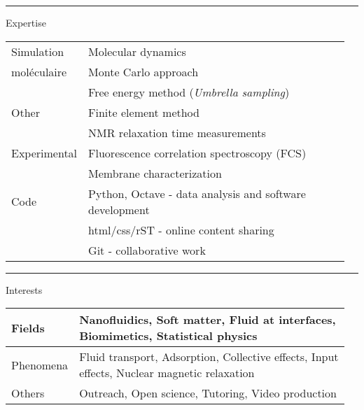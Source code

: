 \documentclass[a4paper,11pt]{concours}
\begin{document}
\newpage

\vspace{0.5cm}

\noindent\begin{minipage}{0.135\linewidth}
{\color{gray120}\rule{\textwidth}{0.22cm}\relax}
\end{minipage}
\begin{minipage}{0.82\linewidth}
{\textcolor{gray120}{\huge Expertise}}
\end{minipage}

\begin{table}[htbp]
\begin{tabular}{@{} p{0.12\linewidth} p{0.84\linewidth} @{}}
Simulation & Molecular dynamics \\
moléculaire      & Monte Carlo approach \\ 
      & Free energy method (\textit{Umbrella sampling}) \\
\hline \hline
Other     & Finite element method \\
      & NMR relaxation time measurements \\
\hline \hline
Experimental & Fluorescence correlation spectroscopy (FCS) \\
     & Membrane characterization \\
\hline \hline
Code &  Python, Octave - data analysis and software development \\
   & html/css/rST - online content sharing \\
   & Git - collaborative work \\
\end{tabular}
\end{table}

\vspace{0.5cm}

\noindent\begin{minipage}{0.135\linewidth}
{\color{gray120}\rule{\textwidth}{0.22cm}\relax}
\end{minipage}
\begin{minipage}{0.82\linewidth}
{\textcolor{gray120}{\huge Interests}}
\end{minipage}

\begin{table}[htbp]
\begin{tabular}{@{} p{0.12\linewidth} p{0.84\linewidth} @{}}
      Fields & Nanofluidics, Soft matter, Fluid at interfaces, Biomimetics, Statistical physics \\
\hline \hline
Phenomena & Fluid transport, Adsorption, Collective effects, Input effects, Nuclear magnetic relaxation \\ 
\hline \hline
Others & Outreach, Open science, Tutoring, Video production \\
\end{tabular}
\end{table}
\end{document}
